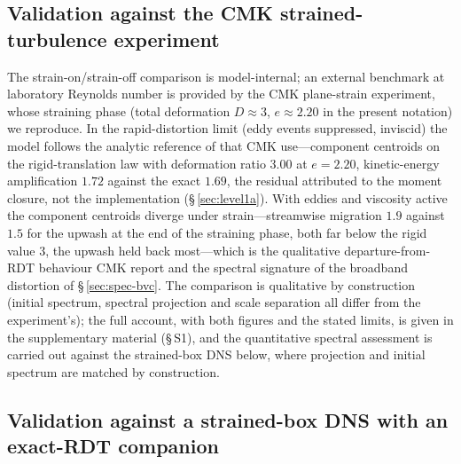 \documentclass[lineno]{JFM-FLM_Au}
\begin{document}
\subsection{Validation against the CMK strained-turbulence experiment}\label{sec:cmk}

The strain-on/strain-off comparison is model-internal; an external
benchmark at laboratory Reynolds number is provided by the CMK plane-strain
experiment, whose straining phase
(total deformation $D\approx3$, $e\approx2.20$ in the present notation)
we reproduce. In the rapid-distortion limit (eddy events suppressed,
inviscid) the model follows the analytic reference of
\citet{LeePiomelliReynolds1986} that CMK use---component centroids on
the rigid-translation law with deformation ratio $3.00$ at $e=2.20$,
kinetic-energy amplification $1.72$ against the exact $1.69$, the
residual attributed to the moment closure, not the implementation (\S\,\ref{sec:level1a}). With eddies and viscosity active the component
centroids diverge under strain---streamwise migration $1.9$ against
$1.5$ for the upwash at the end of the straining phase, both far below
the rigid value $3$, the upwash held back most---which is the
qualitative departure-from-RDT behaviour CMK report and the spectral
signature of the broadband distortion of \S\,\ref{sec:spec-bvc}. The
comparison is qualitative by construction (initial spectrum, spectral
projection and scale separation all differ from the experiment's); the
full account, with both figures and the stated limits, is given in the
supplementary material (\S\,S1), and the quantitative spectral
assessment is carried out against the strained-box DNS below, where
projection and initial spectrum are matched by construction.

\subsection{Validation against a strained-box DNS with an exact-RDT
companion}\label{sec:box-dns}
\end{document}
